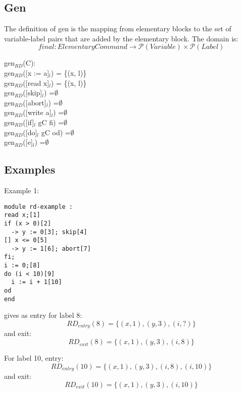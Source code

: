 \subsection{Gen}

The definition of gen is the mapping from elementary blocks to the set of variable-label pairs
that are added by the elementary block. The domain is:
\[final \colon Elementary Command \to \mathcal{P}(Variable)\times\mathcal{P}(Label)\]

\docpar
gen$_{RD}$(C):\\
gen$_{RD}$([x := a]$_l$)           = \{(x, l)\}\\
gen$_{RD}$([read x]$_l$)           = \{(x, l)\}\\
gen$_{RD}$([skip]$_l$)             =$\emptyset$\\
gen$_{RD}$([abort]$_l$) 		   =$\emptyset$\\
gen$_{RD}$([write a]$_l$)          =$\emptyset$\\
gen$_{RD}$([if]$_l$ gC fi)         =$\emptyset$\\
gen$_{RD}$([do]$_l$ gC od)         =$\emptyset$\\
gen$_{RD}$([e]$_l$)                =$\emptyset$\\

\subsection{Examples}

Example 1:

\begin{lstlisting}
module rd-example :
read x;[1]
if (x > 0)[2]
  -> y := 0[3]; skip[4]
[] x <= 0[5]
  -> y := 1[6]; abort[7]
fi;
i := 0;[8]
do (i < 10)[9]
  i := i + 1[10]
od
end
\end{lstlisting}
gives as entry for label 8:
\[RD_{entry}(8) = \{(x, 1), (y, 3), (i, ?)\}\]
and exit:
\[RD_{exit}(8) = \{(x, 1), (y, 3), (i, 8)\}\]

For label 10, entry:
\[RD_{entry}(10) = \{(x, 1), (y, 3), (i, 8), (i, 10)\}\]
and exit:
\[RD_{exit}(10) = \{(x, 1), (y, 3), (i, 10)\}\]



